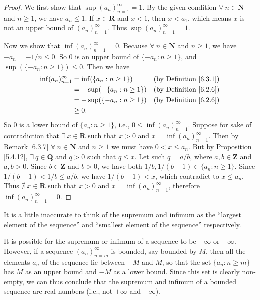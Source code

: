 \begin{proof}
    We first show that \(\sup(a_n)_{n = 1}^\infty = 1\).
    By the given condition \(\forall\ n \in \mathbf{N}\) and \(n \geq 1\), we have \(a_n \leq 1\).
    If \(x \in \mathbf{R}\) and \(x < 1\), then \(x < a_1\), which means \(x\) is not an upper bound of \((a_n)_{n = 1}^\infty\).
    Thus \(\sup(a_n)_{n = 1}^\infty = 1\).

    Now we show that \(\inf(a_n)_{n = 1}^\infty = 0\).
    Because \(\forall\ n \in \mathbf{N}\) and \(n \geq 1\), we have \(-a_n = -1 / n \leq 0\).
    So \(0\) is an upper bound of \(\{-a_n : n \geq 1\}\), and \(\sup(\{-a_n : n \geq 1\}) \leq 0\).
    Then we have
    \begin{align*}
        \inf(a_n)_{n = 1}^\infty & = \inf(\{a_n : n \geq 1\})   & \text{(by Definition \ref{6.3.1})} \\
                                 & = -\sup(-\{a_n : n \geq 1\}) & \text{(by Definition \ref{6.2.6})} \\
                                 & = -\sup(\{-a_n : n \geq 1\}) & \text{(by Definition \ref{6.2.6})} \\
                                 & \geq 0.
    \end{align*}
    So \(0\) is a lower bound of \(\{a_n : n \geq 1\}\), i.e., \(0 \leq \inf(a_n)_{n = 1}^\infty\).
    Suppose for sake of contradiction that \(\exists\ x \in \mathbf{R}\) such that \(x > 0\) and \(x = \inf(a_n)_{n = 1}^\infty\).
    Then by Remark \ref{6.3.7} \(\forall\ n \in \mathbf{N}\) and \(n \geq 1\) we must have \(0 < x \leq a_n\).
    But by Proposition \ref{5.4.12}, \(\exists\ q \in \mathbf{Q}\) and \(q > 0\) such that \(q \leq x\).
    Let such \(q = a / b\), where \(a, b \in \mathbf{Z}\) and \(a, b > 0\).
    Since \(b \in \mathbf{Z}\) and \(b > 0\), we have both \(1 / b, 1 / (b + 1) \in \{a_n : n \geq 1\}\).
    Since \(1 / (b + 1) < 1 / b \leq a / b\), we have \(1 / (b + 1) < x\), which contradict to \(x \leq a_n\).
    Thus \(\nexists\ x \in \mathbf{R}\) such that \(x > 0\) and \(x = \inf(a_n)_{n = 1}^\infty\), therefore \(\inf(a_n)_{n = 1}^\infty = 0\).
\end{proof}

\begin{note}
    It is a little inaccurate to think of the supremum and infimum as the ``largest element of the sequence'' and ``smallest element of the sequence'' respectively.
\end{note}

\begin{note}
    It is possible for the supremum or infimum of a sequence to be \(+\infty\) or \(-\infty\).
    However, if a sequence \((a_n)_{n = m}^\infty\) is bounded, say bounded by \(M\), then all the elements \(a_n\) of the sequence lie between \(-M\) and \(M\), so that the set \(\{a_n : n \geq m\}\) has \(M\) as an upper bound and \(-M\) as a lower bound.
    Since this set is clearly non-empty, we can thus conclude that the supremum and infimum of a bounded sequence are real numbers (i.e., not \(+\infty\) and \(-\infty\)).
\end{note}

